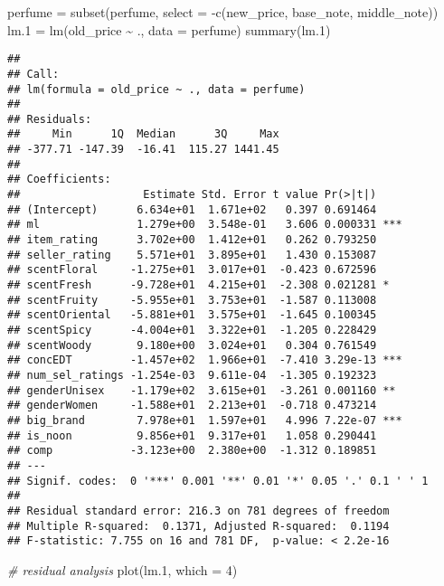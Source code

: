 \documentclass[
]{article}
\newenvironment{Shaded}{\begin{snugshade}}{\end{snugshade}}
\newcommand{\AttributeTok}[1]{\textcolor[rgb]{0.77,0.63,0.00}{#1}}
\newcommand{\CommentTok}[1]{\textcolor[rgb]{0.56,0.35,0.01}{\textit{#1}}}
\newcommand{\DecValTok}[1]{\textcolor[rgb]{0.00,0.00,0.81}{#1}}
\newcommand{\FloatTok}[1]{\textcolor[rgb]{0.00,0.00,0.81}{#1}}
\newcommand{\FunctionTok}[1]{\textcolor[rgb]{0.00,0.00,0.00}{#1}}
\newcommand{\NormalTok}[1]{#1}
\newcommand{\OtherTok}[1]{\textcolor[rgb]{0.56,0.35,0.01}{#1}}
\newcommand{\SpecialCharTok}[1]{\textcolor[rgb]{0.00,0.00,0.00}{#1}}
\begin{document}
\begin{Shaded}
\begin{Highlighting}[]
\NormalTok{perfume }\OtherTok{=} \FunctionTok{subset}\NormalTok{(perfume, }\AttributeTok{select =} \SpecialCharTok{{-}}\FunctionTok{c}\NormalTok{(new\_price, base\_note, middle\_note))}
\NormalTok{lm}\FloatTok{.1} \OtherTok{=} \FunctionTok{lm}\NormalTok{(old\_price }\SpecialCharTok{\textasciitilde{}}\NormalTok{ ., }\AttributeTok{data =}\NormalTok{ perfume)}
\FunctionTok{summary}\NormalTok{(lm}\FloatTok{.1}\NormalTok{)}
\end{Highlighting}
\end{Shaded}

\begin{verbatim}
## 
## Call:
## lm(formula = old_price ~ ., data = perfume)
## 
## Residuals:
##     Min      1Q  Median      3Q     Max 
## -377.71 -147.39  -16.41  115.27 1441.45 
## 
## Coefficients:
##                   Estimate Std. Error t value Pr(>|t|)    
## (Intercept)      6.634e+01  1.671e+02   0.397 0.691464    
## ml               1.279e+00  3.548e-01   3.606 0.000331 ***
## item_rating      3.702e+00  1.412e+01   0.262 0.793250    
## seller_rating    5.571e+01  3.895e+01   1.430 0.153087    
## scentFloral     -1.275e+01  3.017e+01  -0.423 0.672596    
## scentFresh      -9.728e+01  4.215e+01  -2.308 0.021281 *  
## scentFruity     -5.955e+01  3.753e+01  -1.587 0.113008    
## scentOriental   -5.881e+01  3.575e+01  -1.645 0.100345    
## scentSpicy      -4.004e+01  3.322e+01  -1.205 0.228429    
## scentWoody       9.180e+00  3.024e+01   0.304 0.761549    
## concEDT         -1.457e+02  1.966e+01  -7.410 3.29e-13 ***
## num_sel_ratings -1.254e-03  9.611e-04  -1.305 0.192323    
## genderUnisex    -1.179e+02  3.615e+01  -3.261 0.001160 ** 
## genderWomen     -1.588e+01  2.213e+01  -0.718 0.473214    
## big_brand        7.978e+01  1.597e+01   4.996 7.22e-07 ***
## is_noon          9.856e+01  9.317e+01   1.058 0.290441    
## comp            -3.123e+00  2.380e+00  -1.312 0.189851    
## ---
## Signif. codes:  0 '***' 0.001 '**' 0.01 '*' 0.05 '.' 0.1 ' ' 1
## 
## Residual standard error: 216.3 on 781 degrees of freedom
## Multiple R-squared:  0.1371, Adjusted R-squared:  0.1194 
## F-statistic: 7.755 on 16 and 781 DF,  p-value: < 2.2e-16
\end{verbatim}

\begin{Shaded}
\begin{Highlighting}[]
\CommentTok{\# residual analysis}
\FunctionTok{plot}\NormalTok{(lm}\FloatTok{.1}\NormalTok{, }\AttributeTok{which =} \DecValTok{4}\NormalTok{)}
\end{Highlighting}
\end{Shaded}
\end{document}
